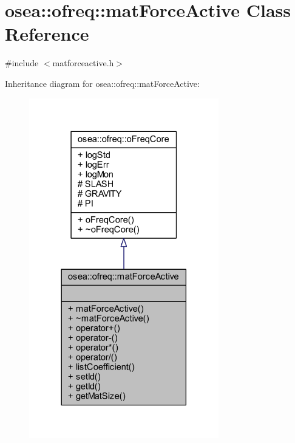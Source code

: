 \hypertarget{classosea_1_1ofreq_1_1mat_force_active}{\section{osea\-:\-:ofreq\-:\-:mat\-Force\-Active Class Reference}
\label{classosea_1_1ofreq_1_1mat_force_active}
}


{\ttfamily \#include $<$matforceactive.\-h$>$}



Inheritance diagram for osea\-:\-:ofreq\-:\-:mat\-Force\-Active\-:
\nopagebreak
\begin{figure}[H]
\begin{center}
\leavevmode
\includegraphics[width=234pt]{classosea_1_1ofreq_1_1mat_force_active__inherit__graph}
\end{center}
\end{figure}
